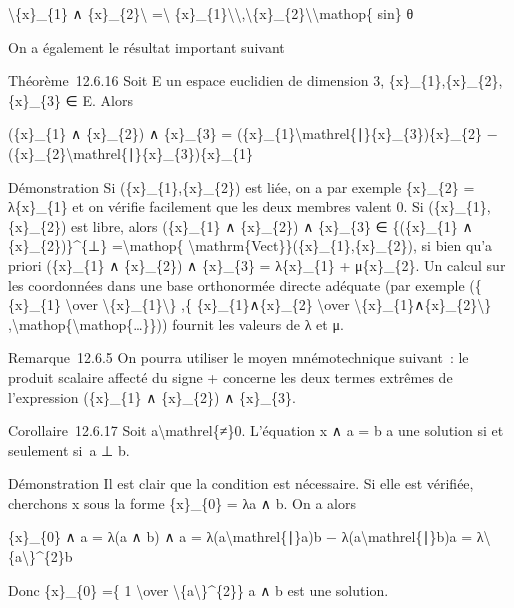 \documentclass[]{article}
\begin{document}
\textbackslash{}\textbar{}\{x\}\_\{1\} ∧
\{x\}\_\{2\}\textbackslash{}\textbar{} =\textbackslash{}\textbar{}
\{x\}\_\{1\}\textbackslash{}\textbar{}\textbackslash{},\textbackslash{}\textbar{}\{x\}\_\{2\}\textbackslash{}\textbar{}\textbackslash{}mathop\{
sin\} θ

On a également le résultat important suivant

Théorème~12.6.16 Soit E un espace euclidien de dimension 3,
\{x\}\_\{1\},\{x\}\_\{2\},\{x\}\_\{3\} ∈ E. Alors

(\{x\}\_\{1\} ∧ \{x\}\_\{2\}) ∧ \{x\}\_\{3\} =
(\{x\}\_\{1\}\textbackslash{}mathrel\{∣\}\{x\}\_\{3\})\{x\}\_\{2\} −
(\{x\}\_\{2\}\textbackslash{}mathrel\{∣\}\{x\}\_\{3\})\{x\}\_\{1\}

Démonstration Si (\{x\}\_\{1\},\{x\}\_\{2\}) est liée, on a par exemple
\{x\}\_\{2\} = λ\{x\}\_\{1\} et on vérifie facilement que les deux
membres valent 0. Si (\{x\}\_\{1\},\{x\}\_\{2\}) est libre, alors
(\{x\}\_\{1\} ∧ \{x\}\_\{2\}) ∧ \{x\}\_\{3\} ∈ \{(\{x\}\_\{1\} ∧
\{x\}\_\{2\})\}\^{}\{⊥\} =\textbackslash{}mathop\{
\textbackslash{}mathrm\{Vect\}\}(\{x\}\_\{1\},\{x\}\_\{2\}), si bien
qu'a priori (\{x\}\_\{1\} ∧ \{x\}\_\{2\}) ∧ \{x\}\_\{3\} = λ\{x\}\_\{1\}
+ μ\{x\}\_\{2\}. Un calcul sur les coordonnées dans une base orthonormée
directe adéquate (par exemple (\{ \{x\}\_\{1\} \textbackslash{}over
\textbackslash{}\textbar{}\{x\}\_\{1\}\textbackslash{}\textbar{}\} ,\{
\{x\}\_\{1\}∧\{x\}\_\{2\} \textbackslash{}over
\textbackslash{}\textbar{}\{x\}\_\{1\}∧\{x\}\_\{2\}\textbackslash{}\textbar{}\}
,\textbackslash{}mathop\{\textbackslash{}mathop\{\ldots{}\}\})) fournit
les valeurs de λ et μ.

Remarque~12.6.5 On pourra utiliser le moyen mnémotechnique suivant~: le
produit scalaire affecté du signe + concerne les deux termes extrêmes de
l'expression (\{x\}\_\{1\} ∧ \{x\}\_\{2\}) ∧ \{x\}\_\{3\}.

Corollaire~12.6.17 Soit a\textbackslash{}mathrel\{≠\}0. L'équation x ∧ a
= b a une solution si et seulement si~a ⊥ b.

Démonstration Il est clair que la condition est nécessaire. Si elle est
vérifiée, cherchons x sous la forme \{x\}\_\{0\} = λa ∧ b. On a alors

\{x\}\_\{0\} ∧ a = λ(a ∧ b) ∧ a = λ(a\textbackslash{}mathrel\{∣\}a)b −
λ(a\textbackslash{}mathrel\{∣\}b)a =
λ\textbackslash{}\textbar{}\{a\textbackslash{}\textbar{}\}\^{}\{2\}b

Donc \{x\}\_\{0\} =\{ 1 \textbackslash{}over
\textbackslash{}\textbar{}\{a\textbackslash{}\textbar{}\}\^{}\{2\}\} a ∧
b est une solution.
\end{document}
